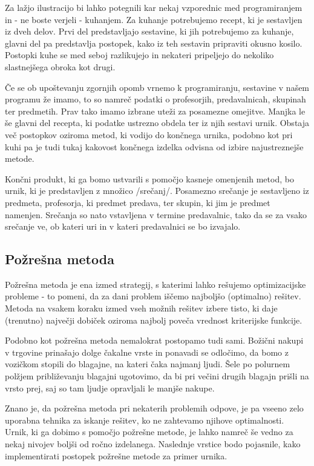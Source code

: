 \documentclass[a4paper, 10pt]{article}
\begin{document}
Za lažjo ilustracijo bi lahko potegnili kar nekaj vzporednic med programiranjem in - ne
boste verjeli - kuhanjem. Za kuhanje potrebujemo recept, ki je sestavljen iz dveh delov.
Prvi del predstavljajo sestavine, ki jih potrebujemo za kuhanje, glavni del pa predstavlja
postopek, kako iz teh sestavin pripraviti okusno kosilo. Postopki kuhe se med seboj
razlikujejo in nekateri pripeljejo do nekoliko slastnejšega obroka kot drugi.

Če se ob upoštevanju zgornjih opomb vrnemo k programiranju, sestavine v našem programu že
imamo, to so namreč podatki o profesorjih, predavalnicah, skupinah ter predmetih. Prav tako
imamo izbrane uteži za posamezne omejitve. Manjka le še glavni del recepta, ki podatke
ustrezno obdela ter iz njih sestavi urnik. Obstaja več postopkov oziroma metod, ki vodijo
do končnega urnika, podobno kot pri kuhi pa je tudi tukaj kakovost končnega izdelka odvisna
od izbire najustreznejše metode.

Končni produkt, ki ga bomo ustvarili s pomočjo kasneje omenjenih metod, bo urnik, ki je
predstavljen z množico /srečanj/. Posamezno srečanje je sestavljeno iz predmeta,
profesorja, ki predmet predava, ter skupin, ki jim je predmet namenjen. Srečanja so nato
vstavljena v termine predavalnic, tako da se za vsako srečanje ve, ob kateri uri in v
kateri predavalnici se bo izvajalo.

\subsection{Požrešna metoda}

Požrešna metoda je ena izmed strategij, s katerimi lahko rešujemo optimizacijske probleme -
to pomeni, da za dani problem iščemo najboljšo (optimalno) rešitev. Metoda na vsakem koraku
izmed vseh možnih rešitev izbere  tisto, ki daje (trenutno) največji dobiček oziroma najbolj
poveča vrednost kriterijske funkcije.

Podobno kot požrešna metoda nemalokrat postopamo tudi sami. Božični nakupi v trgovine
prinašajo dolge čakalne vrste in ponavadi se odločimo, da bomo z vozičkom stopili do blagajne,
na kateri čaka najmanj ljudi. Šele po polurnem polžjem približevanju blagajni ugotovimo,
da bi pri večini drugih blagajn prišli na vrsto prej, saj so tam ljudje opravljali le
manjše nakupe.

Znano je, da požrešna metoda pri nekaterih problemih odpove, je pa vseeno zelo uporabna
tehnika za iskanje rešitev, ko ne zahtevamo njihove optimalnosti. Urnik, ki ga dobimo s
pomočjo požrešne metode, je lahko namreč še vedno za nekaj nivojev boljši od ročno izdelanega.
Naslednje vrstice bodo pojasnile, kako implementirati postopek požrešne metode za primer urnika.
\end{document}
